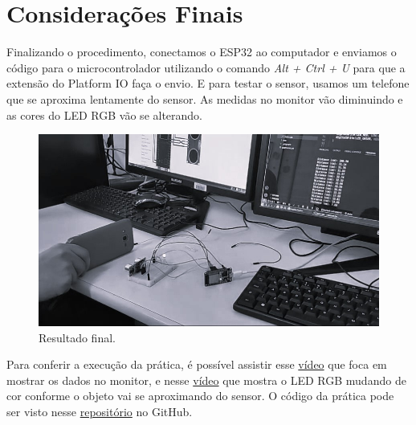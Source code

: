 \section{Considerações Finais}

Finalizando o procedimento, conectamos o ESP32 ao computador e enviamos o código para o microcontrolador utilizando o comando \textit{Alt + Ctrl + U} para que a extensão do Platform IO faça o envio. E para testar o sensor, usamos um telefone que se aproxima lentamente do sensor. As medidas no monitor vão diminuindo e as cores do LED RGB vão se alterando.

\begin{figure}[H]
    \centering
    \includegraphics[width=0.5\linewidth]{img/teste.jpg}
    \caption{Resultado final.}
    \label{fig:result}
\end{figure}

Para conferir a execução da prática, é possível assistir esse \href{https://youtu.be/RUkX7DxMiUE}{vídeo} que foca em mostrar os dados no monitor, e nesse \href{https://youtu.be/0zt2-xrlvYo}{vídeo} que mostra o LED RGB mudando de cor conforme o objeto vai se aproximando do sensor. O código da prática pode ser visto nesse \href{https://github.com/fabricio-araujo94/microcontroladores/tree/main/ultrassom}{repositório} no GitHub.